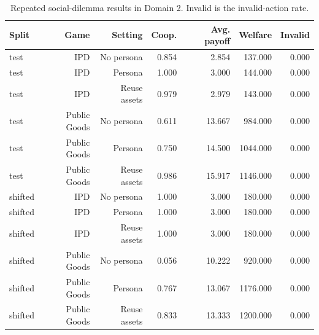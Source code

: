 \begin{table}[t]
\centering
\small
\begin{tabular}{lrrrrrr}
\toprule
Split & Game & Setting & Coop. & Avg. payoff & Welfare & Invalid \\
\midrule
test & IPD & No persona & 0.854 & 2.854 & 137.000 & 0.000 \\
test & IPD & Persona & 1.000 & 3.000 & 144.000 & 0.000 \\
test & IPD & Reuse assets & 0.979 & 2.979 & 143.000 & 0.000 \\
test & Public Goods & No persona & 0.611 & 13.667 & 984.000 & 0.000 \\
test & Public Goods & Persona & 0.750 & 14.500 & 1044.000 & 0.000 \\
test & Public Goods & Reuse assets & 0.986 & 15.917 & 1146.000 & 0.000 \\
shifted & IPD & No persona & 1.000 & 3.000 & 180.000 & 0.000 \\
shifted & IPD & Persona & 1.000 & 3.000 & 180.000 & 0.000 \\
shifted & IPD & Reuse assets & 1.000 & 3.000 & 180.000 & 0.000 \\
shifted & Public Goods & No persona & 0.056 & 10.222 & 920.000 & 0.000 \\
shifted & Public Goods & Persona & 0.767 & 13.067 & 1176.000 & 0.000 \\
shifted & Public Goods & Reuse assets & 0.833 & 13.333 & 1200.000 & 0.000 \\
\bottomrule
\end{tabular}
\caption{Repeated social-dilemma results in Domain 2. Invalid is the invalid-action rate.}
\label{tab:game-main}
\end{table}
